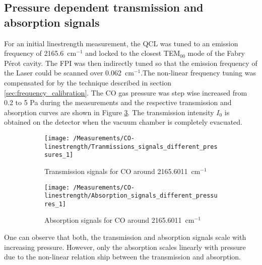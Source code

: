 \subsection{Pressure dependent transmission and absorption signals}
For an initial linestrength measurement, the QCL was tuned to an emission frequency of \mbox{2165.6 cm$^{-1}$} and locked to the closest TEM$_{00}$ mode of the Fabry Pérot cavity. The FPI was then indirectly tuned so that the emission frequency of the Laser could be scanned over \mbox{0.062 cm$^{-1}$}.The non-linear frequency tuning was compensated for by the technique described in section \ref{sec:frequency_calibration}. The CO gas pressure was step wise increased from 0.2 to 5 Pa during the measurements and the respective transmission and absorption curves are shown in Figure \ref{fig:trans_and_abs_signals}. The transmission intensity $I_0$ is obtained on the detector when the vacuum chamber is completely evacuated.
\begin{figure}[H] 
	\begin{subfigure}[t]{.48\textwidth}
		\centering 
		\texttt{[image: /Measurements/CO-linestrength/Tranmissions\_signals\_different\_pressures\_1]}
		\caption{Transmission signals for CO around \mbox{2165.6011 cm$^{-1}$}}
		\label{fig:transmission_signals_1}
	\end{subfigure}
	\hfill
	\begin{subfigure}[t]{.48\textwidth}
		\centering
		\texttt{[image: /Measurements/CO-linestrength/Absorption\_signals\_different\_pressures\_1]}
		\caption{Absorption signals for CO around \mbox{2165.6011 cm$^{-1}$}}
		\label{fig:absorption_signals_1}
	\end{subfigure}
	\caption{}
	\label{fig:trans_and_abs_signals}
\end{figure}
\noindent
One can observe that both, the transmission and absorption signals scale with increasing pressure. However, only the absorption scales linearly with pressure due to the non-linear relation ship between the transmission and absorption. \\\\
